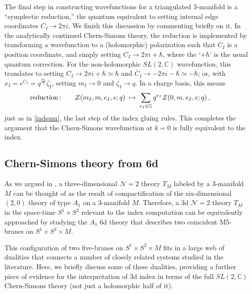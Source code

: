 \documentclass[11pt,letterpaper]{article}
\numberwithin{equation}{section}
\newcommand{\be}{\begin{equation}}
\newcommand{\ee}{\end{equation}}
\newcommand{\ol}{\overline}
\newcommand{\Z}{{\mathbb Z}}
\newcommand{\C}{{\mathbb C}}
\newcommand{\CN}{\mathcal{N}}
\newcommand{\CZ}{\mathcal{Z}}
\begin{document}
The final step in constructing wavefunctions for a triangulated 3-manifold is a ``symplectic reduction,'' the quantum equivalent to setting internal edge coordinates $C_I\to 2\pi i$. We finish this discussion by commenting briefly on it. In the analytically continued Chern-Simons theory, the reduction is implemented by transforming a wavefunction to a (holomorphic) polarization such that $C_I$ is a position coordinate, and simply setting $C_I \to 2\pi i +\hbar$, where the `$+\hbar$' is the usual quantum correction. For the non-holomorphic $SL(2,\C)$ wavefunction, this translates to setting $C_I\to 2\pi i+\hbar \simeq \hbar$ and $\ol C_I \to -2\pi i-\hbar\simeq -\hbar$; or, with $x_I = e^{C_I} = q^{\frac{m_I}{2}}\zeta_I$, setting $m_I\to 0$ and $\zeta_I \to q$. In a charge basis, this means
%
\be\text{reduction\,:}\qquad \CZ(m_I,m,e_I,e;q)\;\mapsto\; \sum_{e_I\in \Z} q^{e_I}\CZ(0,m,e_I,e;q)\,,\qquad\ee
%
just as in \eqref{indsum}, the last step of the index gluing rules. This completes the argument that the Chern-Simons wavefunction at $k=0$ is fully equivalent to the index.


\subsection{Chern-Simons theory from 6d}
\label{sec:6d}

As we argued in \cite{DGG}, a three-dimensional $\CN=2$ theory $T_M$ labeled by a 3-manifold $M$ can be thought of
as the result of compactification of the six-dimensional $(2,0)$ theory of type $A_1$ on a 3-manifold $M$.
Therefore, a 3d $\CN=2$ theory $T_M$ in the space-time $S^1 \times S^2$ relevant to the index computation
can be equivalently approached by studying the $A_1$ 6d theory that describes two coincident M5-branes on $S^1 \times S^2 \times M$.

This configuration of two five-branes on $S^1 \times S^2 \times M$ fits in a large web of dualities
that connects a number of closely related systems studied in the literature. Here, we briefly discuss some of
these dualities, providing a further piece of evidence for the interpretation of 3d index
in terms of the full $SL(2,\C)$ Chern-Simons theory (not just a holomorphic half of it).
\end{document}
